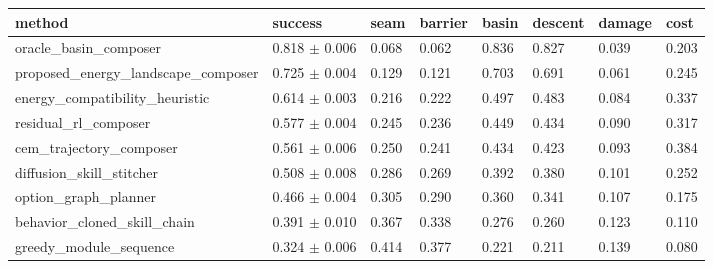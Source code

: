 \begin{tabular}{llllllll}
\toprule
method & success & seam & barrier & basin & descent & damage & cost \\
\midrule
oracle\_basin\_composer & 0.818 $\pm$ 0.006 & 0.068 & 0.062 & 0.836 & 0.827 & 0.039 & 0.203 \\
proposed\_energy\_landscape\_composer & 0.725 $\pm$ 0.004 & 0.129 & 0.121 & 0.703 & 0.691 & 0.061 & 0.245 \\
energy\_compatibility\_heuristic & 0.614 $\pm$ 0.003 & 0.216 & 0.222 & 0.497 & 0.483 & 0.084 & 0.337 \\
residual\_rl\_composer & 0.577 $\pm$ 0.004 & 0.245 & 0.236 & 0.449 & 0.434 & 0.090 & 0.317 \\
cem\_trajectory\_composer & 0.561 $\pm$ 0.006 & 0.250 & 0.241 & 0.434 & 0.423 & 0.093 & 0.384 \\
diffusion\_skill\_stitcher & 0.508 $\pm$ 0.008 & 0.286 & 0.269 & 0.392 & 0.380 & 0.101 & 0.252 \\
option\_graph\_planner & 0.466 $\pm$ 0.004 & 0.305 & 0.290 & 0.360 & 0.341 & 0.107 & 0.175 \\
behavior\_cloned\_skill\_chain & 0.391 $\pm$ 0.010 & 0.367 & 0.338 & 0.276 & 0.260 & 0.123 & 0.110 \\
greedy\_module\_sequence & 0.324 $\pm$ 0.006 & 0.414 & 0.377 & 0.221 & 0.211 & 0.139 & 0.080 \\
\bottomrule
\end{tabular}
